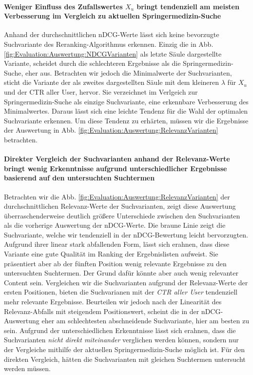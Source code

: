 \paragraph{Weniger Einfluss des Zufallswertes $X_u$ bringt tendenziell am meisten	 Verbesserung im Vergleich zu aktuellen Springermedizin-Suche} 
Anhand der durchschnittlichen nDCG-Werte lässt sich keine bevorzugte Suchvariante des Reranking-Algorithmus erkennen. Einzig die in Abb. \ref{fig:Evaluation:Auswertung:NDCGVarianten} als letzte Säule dargestellte Variante, scheidet durch die schlechteren Ergebnisse als die Springermedizin-Suche, eher aus. Betrachten wir jedoch die Minimalwerte der Suchvarianten, sticht die Variante der als zweites dargestellten Säule mit dem kleineren $\lambda$ für $X_u$ und der CTR aller User, hervor. Sie verzeichnet im Verlgeich zur Springermedizin-Suche als einzige Suchvariante, eine erkennbare Verbesserung des Minimalwertes. Daraus lässt sich eine leichte Tendenz für die Wahl der optimalen Suchvariante erkennen. Um diese Tendenz zu erhärten, müssen wir die Ergebnisse der Auswertung in Abb. \ref{fig:Evaluation:Auswertung:RelevanzVarianten} betrachten.

\paragraph{Direkter Vergleich der Suchvarianten anhand der Relevanz-Werte bringt wenig Erkenntnisse aufgrund unterschiedlicher Ergebnisse basierend auf den untersuchten Suchtermen} 
Betrachten wir die Abb. \ref{fig:Evaluation:Auswertung:RelevanzVarianten} der durchschnittlichen Relevanz-Werte der Suchvarianten, zeigt diese Auswertung überraschenderweise deutlich größere Unterschiede zwischen den Suchvarianten als die vorherige Auswertung der nDCG-Werte. Die braune Linie zeigt die Suchvariante, welche wir tendenziell in der nDCG-Bewertung leicht bervorzugten. Aufgrund ihrer linear stark abfallenden Form, lässt sich erahnen, dass diese Variante eine gute Qualität im Ranking der Ergebnislisten aufweist. Sie präsentiert aber ab der fünften Position wenig relevante Ergebnisse zu den untersuchten Suchtermen. Der Grund dafür könnte aber auch wenig relevanter Content sein. Vergleichen wir die Suchvarianten aufgrund der Relevanz-Werte der ersten Positionen, bieten die Suchvarianen mit der \textit{CTR aller User} tendenziell mehr relevante Ergebnisse. Beurteilen wir jedoch nach der Linearität des Relevanz-Abfalls mit steigendem Positionswert, scheint die in der nDCG-Auswertung eher am schlechtesten abschneidende Suchvariante, hier am besten zu sein. Aufgrund der unterschiedlichen Erkenntnisse lässt sich erahnen, dass die Suchvarianten \textit{nicht direkt miteinander} verglichen werden können, sondern nur der Vergleiche mithilfe der aktuellen Springermedizin-Suche möglich ist. Für den direkten Vergleich, hätten die Suchvarianten mit gleichen Suchtermen untersucht werden müssen.

